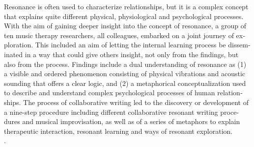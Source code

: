     \begin{adjmulticols}{1}{10mm}{10mm}
\label{paper2:abstract}
    \bigskip
    \begin{otherlanguage}{english}
    {\small
    \fadebreak

\noindent Resonance is often used to characterize relationships, but it is a complex concept that explains quite different physical, physiological and psychological processes. With the aim of gaining deeper insight into the concept of resonance, a group of ten music therapy researchers, all colleagues, embarked on a joint journey of exploration. This included an aim of letting the internal learning process be disseminated in a way that could give others insight, not only from the findings, but also from the process. Findings include a dual understanding of resonance as (1) a visible and ordered phenomenon consisting of physical vibrations and acoustic sounding that offers a clear logic, and (2) a metaphorical conceptualization used to describe and understand complex psychological processes of human relationships. The process of collaborative writing led to the discovery or development of a nine-step procedure including different collaborative resonant writing procedures and musical improvisation, as well as of a series of metaphors to explain therapeutic interaction, resonant learning and ways of resonant exploration. 
%
\medskip
%
\\\hspace*{1.75em}{resonance, collaborative thinking, musicking and writing, improvisation, music therapy, qualitative research}.








    } %

    \fadebreak

    \end{otherlanguage}

    \end{adjmulticols}